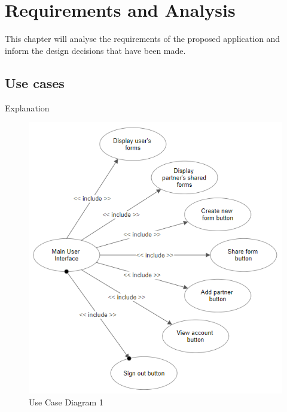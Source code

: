 \chapter{Requirements and Analysis} \label{Chapter:three}

This chapter will analyse the requirements of the proposed application and inform the design decisions that have been made.

\section{Use cases}
Explanation

\begin{figure}[]
    \center
    \includegraphics{../figures/UseCaseInterface}
    \caption{Use Case Diagram 1}
\end{figure}

